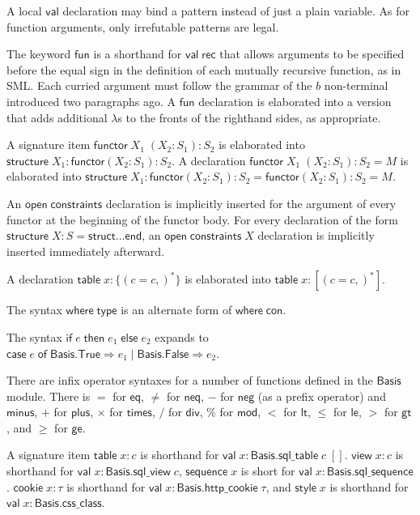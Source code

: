 \documentclass{article}
\newcommand{\mt}[1]{\mathsf{#1}}
\begin{document}
A local $\mt{val}$ declaration may bind a pattern instead of just a plain variable.  As for function arguments, only irrefutable patterns are legal.

The keyword $\mt{fun}$ is a shorthand for $\mt{val} \; \mt{rec}$ that allows arguments to be specified before the equal sign in the definition of each mutually recursive function, as in SML.  Each curried argument must follow the grammar of the $b$ non-terminal introduced two paragraphs ago.  A $\mt{fun}$ declaration is elaborated into a version that adds additional $\lambda$s to the fronts of the righthand sides, as appropriate.

A signature item $\mt{functor} \; X_1 \; (X_2 : S_1) : S_2$ is elaborated into $\mt{structure} \; X_1 : \mt{functor}(X_2 : S_1) : S_2$.  A declaration $\mt{functor} \; X_1 \; (X_2 : S_1) : S_2 = M$ is elaborated into $\mt{structure} \; X_1 : \mt{functor}(X_2 : S_1) : S_2 = \mt{functor}(X_2 : S_1) : S_2 = M$.

An $\mt{open} \; \mt{constraints}$ declaration is implicitly inserted for the argument of every functor at the beginning of the functor body.  For every declaration of the form $\mt{structure} \; X : S = \mt{struct} \ldots \mt{end}$, an $\mt{open} \; \mt{constraints} \; X$ declaration is implicitly inserted immediately afterward.

A declaration $\mt{table} \; x : \{(c = c,)^*\}$ is elaborated into $\mt{table} \; x : [(c = c,)^*]$.

The syntax $\mt{where} \; \mt{type}$ is an alternate form of $\mt{where} \; \mt{con}$.

The syntax $\mt{if} \; e \; \mt{then} \; e_1 \; \mt{else} \; e_2$ expands to $\mt{case} \; e \; \mt{of} \; \mt{Basis}.\mt{True} \Rightarrow e_1 \mid \mt{Basis}.\mt{False} \Rightarrow e_2$.

There are infix operator syntaxes for a number of functions defined in the $\mt{Basis}$ module.  There is $=$ for $\mt{eq}$, $\neq$ for $\mt{neq}$, $-$ for $\mt{neg}$ (as a prefix operator) and $\mt{minus}$, $+$ for $\mt{plus}$, $\times$ for $\mt{times}$, $/$ for $\mt{div}$, $\%$ for $\mt{mod}$, $<$ for $\mt{lt}$, $\leq$ for $\mt{le}$, $>$ for $\mt{gt}$, and $\geq$ for $\mt{ge}$.

A signature item $\mt{table} \; x : c$ is shorthand for $\mt{val} \; x : \mt{Basis}.\mt{sql\_table} \; c \; []$.  $\mt{view} \; x : c$ is shorthand for $\mt{val} \; x : \mt{Basis}.\mt{sql\_view} \; c$, $\mt{sequence} \; x$ is short for $\mt{val} \; x : \mt{Basis}.\mt{sql\_sequence}$.  $\mt{cookie} \; x : \tau$ is shorthand for $\mt{val} \; x : \mt{Basis}.\mt{http\_cookie} \; \tau$, and $\mt{style} \; x$ is shorthand for $\mt{val} \; x : \mt{Basis}.\mt{css\_class}$.
\end{document}

